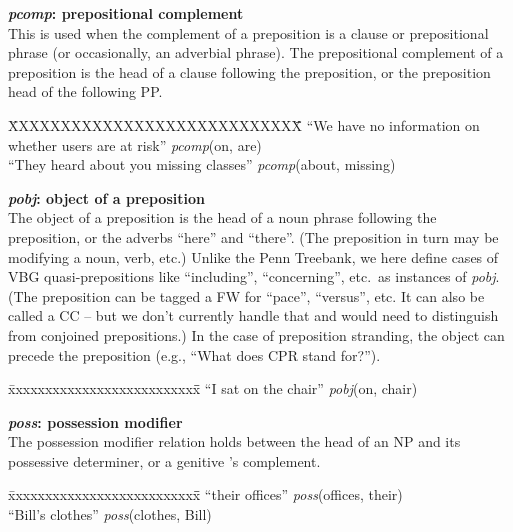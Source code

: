 \documentclass[11pt,letterpaper]{article}
\begin{document}
\noindent\textbf{\emph{pcomp}: prepositional complement}\\
This is used when the complement of a preposition is a clause or
prepositional phrase (or occasionally, an adverbial phrase).
The prepositional complement of a preposition is the head of a clause
following the preposition,
or the preposition head of the following PP.
\begin{tabbing}
\hspace{1cm} \=XXXXXXXXXXXXXXXXXXXXXXXXXXXX\= \hspace{2cm}\=  \kill
\>  ``We have no information on whether users are at risk'' \> \> \emph{pcomp}(on, are)\\
\hspace{1cm} \> ``They heard about you missing classes'' \> \>  \emph{pcomp}(about, missing)\\
\end{tabbing}

\noindent\textbf{\emph{pobj}: object of a preposition}\\
The object of a preposition is the head of a noun phrase following the preposition, or the adverbs ``here'' and ``there''. (The preposition in turn may be modifying a noun, verb, etc.) Unlike the Penn Treebank, we here define cases of VBG quasi-prepositions like ``including'', ``concerning'', etc.\ as instances of \emph{pobj}. (The preposition can be tagged a FW for ``pace'', ``versus'', etc. It can also be called a CC -- but we don't currently handle that and would need to distinguish from conjoined prepositions.) In the case of preposition stranding, the object can precede the preposition (e.g., ``What does CPR stand for?'').
\begin{tabbing}
\hspace{1cm} \= xxxxxxxxxxxxxxxxxxxxxxxxxx\= \hspace{.5cm}\=  \kill
\>  ``I sat on the chair'' \> \> \emph{pobj}(on, chair)\\
\end{tabbing}

\noindent\textbf{\emph{poss}: possession modifier}\\
The possession modifier relation holds between the head of an NP and its possessive determiner, or a genitive 's complement.
\begin{tabbing}
\hspace{1cm} \= xxxxxxxxxxxxxxxxxxxxxxxxxx\= \hspace{.5cm}\=  \kill
\>  ``their offices'' \> \> \emph{poss}(offices, their)\\
\> ``Bill's clothes'' \> \> \emph{poss}(clothes, Bill)\\
\end{tabbing}
\end{document}
